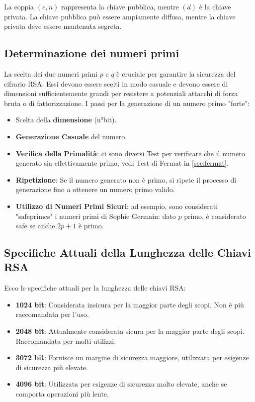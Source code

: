 \documentclass[a4paper,12pt]{report}
\begin{document}
La coppia $(e, n)$ rappresenta la chiave pubblica, mentre $(d)$ è la chiave privata. La chiave pubblica può essere ampiamente diffusa, mentre la chiave privata deve essere mantenuta segreta.

\subsection*{Determinazione dei numeri primi}
La scelta dei due numeri primi $p$ e $q$ è cruciale per garantire la sicurezza del cifrario RSA. 
Essi devono essere scelti in modo casuale e devono essere di dimensioni sufficientemente grandi per resistere a potenziali attacchi di forza bruta o di fattorizzazione.
I passi per la generazione di un numero primo "forte":

\begin{itemize}
    \item{Scelta della \textbf{dimensione} (n°bit).}
    \item{\textbf{Generazione Casuale} del numero.} 
    \item{\textbf{Verifica della Primalità}: ci sono diversi Test per verificare che il numero generato sia effettivamente primo, vedi Test di Fermat in \ref{sec:fermat}.}
    \item{\textbf{Ripetizione}: Se il numero generato non è primo, si ripete il processo di generazione fino a ottenere un numero primo valido.}
    \item{\textbf{Utilizzo di Numeri Primi Sicuri}: ad esempio, sono considerati "safeprimes" i numeri primi di Sophie Germain: dato $p$ primo, è considerato safe se anche \(2p+1\) è primo. \cite{boneh2005}}
\end{itemize}

\subsection*{Specifiche Attuali della Lunghezza delle Chiavi RSA}

Ecco le specifiche attuali per la lunghezza delle chiavi RSA:

\begin{itemize}
    \item \textbf{1024 bit}: Considerata insicura per la maggior parte degli scopi. Non è più raccomandata per l'uso.
    \item \textbf{2048 bit}: Attualmente considerata sicura per la maggior parte degli scopi. Raccomandata per molti utilizzi.
    \item \textbf{3072 bit}: Fornisce un margine di sicurezza maggiore, utilizzata per esigenze di sicurezza più elevate.
    \item \textbf{4096 bit}: Utilizzata per esigenze di sicurezza molto elevate, anche se comporta operazioni più lente.
\end{itemize}
\end{document}
